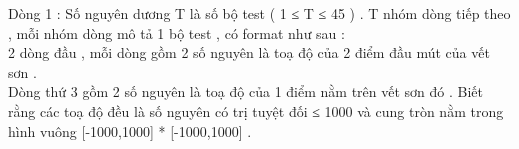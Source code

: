Dòng 1 : Số nguyên dương T là số bộ test ( 1 ≤ T ≤ 45 ) . T nhóm dòng tiếp theo , mỗi nhóm dòng mô tả 1 bộ test , có format như sau :   
\\   2 dòng đầu , mỗi dòng gồm 2 số nguyên là toạ độ của 2 điểm đầu mút của vết sơn .   
\\   Dòng thứ 3 gồm 2 số nguyên là toạ độ của 1 điểm nằm trên vết sơn đó . Biết rằng các toạ độ đều là số nguyên có trị tuyệt đối ≤ 1000 và cung tròn nằm trong hình vuông [-1000,1000] * [-1000,1000] .  

\